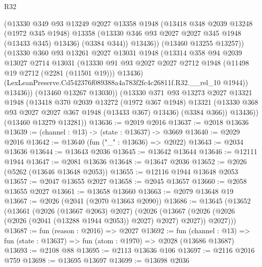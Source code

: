 \begin{lexlean}{R32}
\begin{coremodule}
                (@13330
                  @349
                  @93
                  @13249
                  @2027
                  @13358
                  @1948
                  (@13418
                    @348
                    @2039
                    @13248
                    (@1972 @345 @1948)
                    @13358
                    (@13330 @346 @93 @2027 @2027 @345 @1948 (@13433 @345) @13436)
                    (@3384 @344))
                  @13436))
              (@13460 @13255 @13257))
            (@13330
              @360
              @93
              @13261
              @2027
              @13031
              @1948
              (@13314
                @358
                @94
                @2039
                @13027
                @2714
                @13031
                (@13330
                  @91
                  @93
                  @2027
                  @2027
                  @2712
                  @1948
                  (@11498 @19 @2712 (@2281 (@11501 @19)))
                  @13436)
                (LexLeanPreserve.Cd542376f089388a4a783f2fc4c26811f.R32.__rel_10 @1944))
              @13436))
          (@13460 @13267 @13030))
        (@13330
          @371
          @93
          @13273
          @2027
          @13321
          @1948
          (@13418
            @370
            @2039
            @13272
            (@1972 @367 @1948)
            @13321
            (@13330 @368 @93 @2027 @2027 @367 @1948 (@13433 @367) @13436)
            (@3384 @366))
          @13436))
      (@13460 @13279 @13281))
@13636 := @2019 @2016
@13637 := @2018 @13636
@13639 := (channel : @13) -> (state : @13637) -> @3669
@13640 := @2029 @2016
@13642 := @13640 (fun ("_" : @13636) => @2022)
@13643 := @2034 @13636
@13644 := @13643 @2036
@13645 := @13642 @13644
@13646 := @12111 @1944
@13647 := @2081 @13636
@13648 := @13647 @2036
@13652 := @2026 (@5262 (@13646 @13648 @2053))
@13655 := @12116 @1944 @13648 @2053
@13657 := @2047 @13655 @2027
@13658 := @2045 @13657
@13660 := @2058 @13655 @2027
@13661 := @13658 @13660
@13663 := @2079 @13648 @19
@13667 := @2026 (@2041 (@2070 @13663 @2090))
@13686 := @13645
    (@13652
      (@13661
        (@2026 (@13667 @2063) @2027)
        (@2026
          (@13667 (@2026 (@2026 (@2026 (@2041 (@13288 @1944 @2053)) @2027) @2027) @2027))
          @2027)))
@13687 := fun (reason : @2016) => @2027
@13692 := fun (channel : @13) => fun (state : @13637) => fun (atom : @1970) => @2028 (@13686 @13687)
@13693 := @2108 @88
@13695 := @2113 @13636 @106
@13697 := @2116 @2016 @759
@13698 := @13695 @13697
@13699 := @13698 @2036

\end{coremodule}
\end{lexlean}

